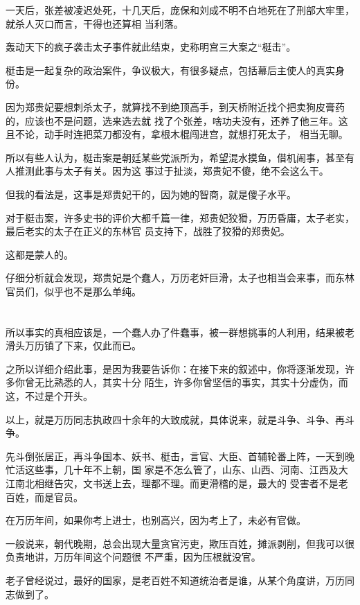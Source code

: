 \documentclass[11pt,a4paper,onecolumn]{article}
\begin{document}
一天后，张差被凌迟处死，十几天后，庞保和刘成不明不白地死在了刑部大牢里，就杀人灭口而言，干得也还算相
当利落。

轰动天下的疯子袭击太子事件就此结束，史称明宫三大案之``梃击''。

梃击是一起复杂的政治案件，争议极大，有很多疑点，包括幕后主使人的真实身份。

因为郑贵妃要想刺杀太子，就算找不到绝顶高手，到天桥附近找个把卖狗皮膏药的，应该也不是问题，选来选去就
找了个张差，啥功夫没有，还养了他三年。这且不论，动手时连把菜刀都没有，拿根木棍闯进宫，就想打死太子，
相当无聊。

所以有些人认为，梃击案是朝廷某些党派所为，希望混水摸鱼，借机闹事，甚至有人推测此事与太子有关。因为这
事过于扯淡，郑贵妃不傻，绝不会这么干。

但我的看法是，这事是郑贵妃干的，因为她的智商，就是傻子水平。

对于梃击案，许多史书的评价大都千篇一律，郑贵妃狡猾，万历昏庸，太子老实，最后老实的太子在正义的东林官
员支持下，战胜了狡猾的郑贵妃。

这都是蒙人的。

仔细分析就会发现，郑贵妃是个蠢人，万历老奸巨滑，太子也相当会来事，而东林官员们，似乎也不是那么单纯。

\section[\thesection]{}

所以事实的真相应该是，一个蠢人办了件蠢事，被一群想挑事的人利用，结果被老滑头万历镇了下来，仅此而已。

之所以详细介绍此事，是因为我要告诉你：在接下来的叙述中，你将逐渐发现，许多你曾无比熟悉的人，其实十分
陌生，许多你曾坚信的事实，其实十分虚伪，而这，不过是个开头。

以上，就是万历同志执政四十余年的大致成就，具体说来，就是斗争、斗争、再斗争。

先斗倒张居正，再斗争国本、妖书、梃击，言官、大臣、首辅轮番上阵，一天到晚忙活这些事，几十年不上朝，国
家是不怎么管了，山东、山西、河南、江西及大江南北相继告灾，文书送上去，理都不理。而更滑稽的是，最大的
受害者不是老百姓，而是官员。

在万历年间，如果你考上进士，也别高兴，因为考上了，未必有官做。

一般说来，朝代晚期，总会出现大量贪官污吏，欺压百姓，摊派剥削，但我可以很负责地讲，万历年间这个问题很
不严重，因为压根就没官。

老子曾经说过，最好的国家，是老百姓不知道统治者是谁，从某个角度讲，万历同志做到了。
\end{document}
